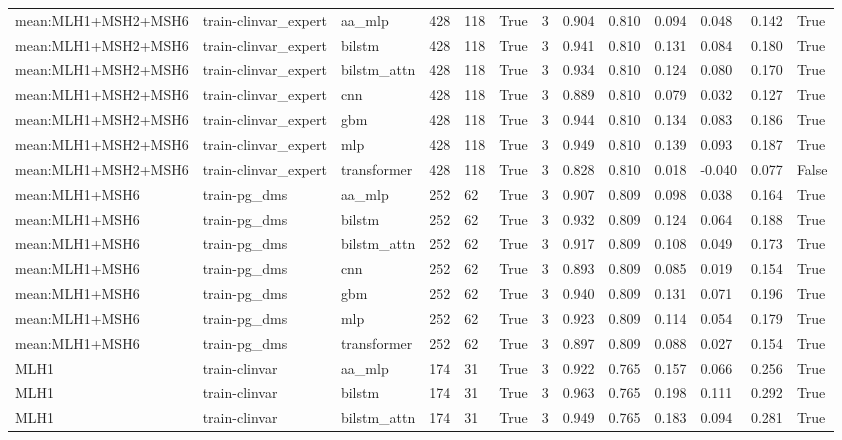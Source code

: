 \begin{table}[t]
\begin{tabular}{lllllllllllll}
mean:MLH1+MSH2+MSH6 & train-clinvar\_expert & aa\_mlp & 428 & 118 & True & 3 & 0.904 & 0.810 & 0.094 & 0.048 & 0.142 & True \\
mean:MLH1+MSH2+MSH6 & train-clinvar\_expert & bilstm & 428 & 118 & True & 3 & 0.941 & 0.810 & 0.131 & 0.084 & 0.180 & True \\
mean:MLH1+MSH2+MSH6 & train-clinvar\_expert & bilstm\_attn & 428 & 118 & True & 3 & 0.934 & 0.810 & 0.124 & 0.080 & 0.170 & True \\
mean:MLH1+MSH2+MSH6 & train-clinvar\_expert & cnn & 428 & 118 & True & 3 & 0.889 & 0.810 & 0.079 & 0.032 & 0.127 & True \\
mean:MLH1+MSH2+MSH6 & train-clinvar\_expert & gbm & 428 & 118 & True & 3 & 0.944 & 0.810 & 0.134 & 0.083 & 0.186 & True \\
mean:MLH1+MSH2+MSH6 & train-clinvar\_expert & mlp & 428 & 118 & True & 3 & 0.949 & 0.810 & 0.139 & 0.093 & 0.187 & True \\
mean:MLH1+MSH2+MSH6 & train-clinvar\_expert & transformer & 428 & 118 & True & 3 & 0.828 & 0.810 & 0.018 & -0.040 & 0.077 & False \\
mean:MLH1+MSH6 & train-pg\_dms & aa\_mlp & 252 & 62 & True & 3 & 0.907 & 0.809 & 0.098 & 0.038 & 0.164 & True \\
mean:MLH1+MSH6 & train-pg\_dms & bilstm & 252 & 62 & True & 3 & 0.932 & 0.809 & 0.124 & 0.064 & 0.188 & True \\
mean:MLH1+MSH6 & train-pg\_dms & bilstm\_attn & 252 & 62 & True & 3 & 0.917 & 0.809 & 0.108 & 0.049 & 0.173 & True \\
mean:MLH1+MSH6 & train-pg\_dms & cnn & 252 & 62 & True & 3 & 0.893 & 0.809 & 0.085 & 0.019 & 0.154 & True \\
mean:MLH1+MSH6 & train-pg\_dms & gbm & 252 & 62 & True & 3 & 0.940 & 0.809 & 0.131 & 0.071 & 0.196 & True \\
mean:MLH1+MSH6 & train-pg\_dms & mlp & 252 & 62 & True & 3 & 0.923 & 0.809 & 0.114 & 0.054 & 0.179 & True \\
mean:MLH1+MSH6 & train-pg\_dms & transformer & 252 & 62 & True & 3 & 0.897 & 0.809 & 0.088 & 0.027 & 0.154 & True \\
MLH1 & train-clinvar & aa\_mlp & 174 & 31 & True & 3 & 0.922 & 0.765 & 0.157 & 0.066 & 0.256 & True \\
MLH1 & train-clinvar & bilstm & 174 & 31 & True & 3 & 0.963 & 0.765 & 0.198 & 0.111 & 0.292 & True \\
MLH1 & train-clinvar & bilstm\_attn & 174 & 31 & True & 3 & 0.949 & 0.765 & 0.183 & 0.094 & 0.281 & True \\

\end{tabular}
\end{table}
